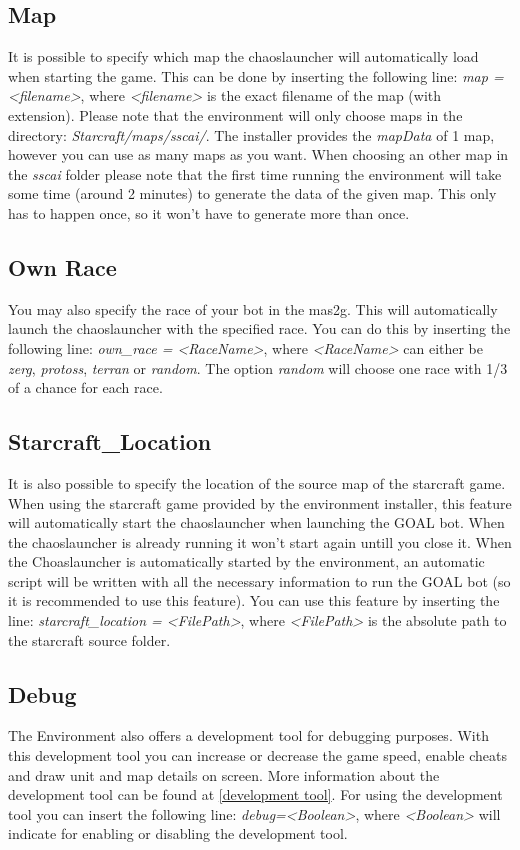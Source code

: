 \subsection{Map}
\label{map}
It is possible to specify which map the chaoslauncher will automatically load when starting the game. This can be done by inserting the following line: \textit{map = <filename>}, where \textit{<filename>} is the exact filename of the map (with extension). Please note that the environment will only choose maps in the directory: \textit{Starcraft/maps/sscai/}. The installer provides the \textit{mapData} of 1 map, however you can use as many maps as you want. When choosing an other map in the \textit{sscai} folder please note that the first time running the environment will take some time (around 2 minutes) to generate the data of the given map. This only has to happen once, so it won't have to generate more than once.

\subsection{Own Race}
\label{own race}
You may also specify the race of your bot in the mas2g. This will automatically launch the chaoslauncher with the specified race. You can do this by inserting the following line: \textit{own\_race = <RaceName>}, where \textit{<RaceName>} can either be \textit{zerg}, \textit{protoss}, \textit{terran} or \textit{random}. The option \textit{random} will choose one race with 1/3 of a chance for each race. 

\subsection{Starcraft\_Location}
\label{starcraft location}
It is also possible to specify the location of the source map of the starcraft game. When using the starcraft game provided by the environment installer, this feature will automatically start the chaoslauncher when launching the GOAL bot. When the chaoslauncher is already running it won't start again untill you close it. When the Choaslauncher is automatically started by the environment, an automatic script will be written with all the necessary information to run the GOAL bot (so it is recommended to use this feature). You can use this feature by inserting the line: \textit{starcraft\_location = <FilePath>}, where \textit{<FilePath>} is the absolute path to the starcraft source folder.

\subsection{Debug}
\label{debug}
The Environment also offers a development tool for debugging purposes. With this development tool you can increase or decrease the game speed, enable cheats and draw unit and map details on screen. More information about the development tool can be found at \ref{development tool}. For using the development tool you can insert the following line: \textit{debug=<Boolean>}, where \textit{<Boolean>} will indicate for enabling or disabling the development tool.

